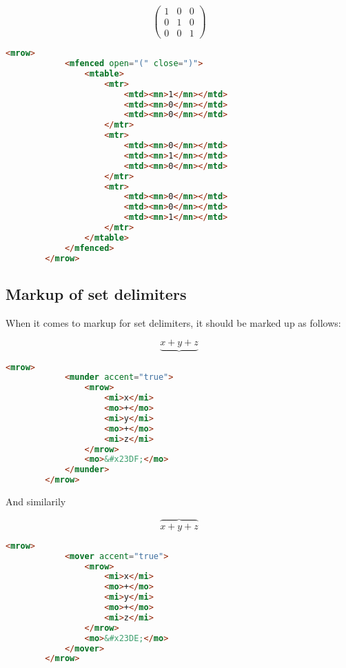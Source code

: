 \documentclass[english,a4paper,11pt]{article}
\begin{document}
\begin{eksempler}
	\begin{equation}
	\begin{pmatrix}
		1 & 0 & 0\\
		0 & 1 & 0\\
		0 & 0 & 1
	\end{pmatrix}
	\end{equation}

	\begin{lstlisting}[language=HTML]
		<mrow>
			<mfenced open="(" close=")">
				<mtable>
					<mtr>
						<mtd><mn>1</mn></mtd>
						<mtd><mn>0</mn></mtd>
						<mtd><mn>0</mn></mtd>
					</mtr>
					<mtr>
						<mtd><mn>0</mn></mtd>
						<mtd><mn>1</mn></mtd>
						<mtd><mn>0</mn></mtd>
					</mtr>
					<mtr>
						<mtd><mn>0</mn></mtd>
						<mtd><mn>0</mn></mtd>
						<mtd><mn>1</mn></mtd>
					</mtr>
				</mtable>
			</mfenced>
	  	</mrow>
	\end{lstlisting}
\end{eksempler}

\subsection{Markup of set delimiters}

When it comes to markup for set delimiters, it should be marked up as follows:

\begin{eksempler}
	\begin{equation}
		\underbrace{x+y+z}
	\end{equation}

	\begin{lstlisting}[language=HTML]
		<mrow>
			<munder accent="true">
				<mrow>
					<mi>x</mi>
					<mo>+</mo>
					<mi>y</mi>
					<mo>+</mo>
					<mi>z</mi>
				</mrow>
				<mo>&#x23DF;</mo>
			</munder>
	  	</mrow>
	\end{lstlisting}


And similarily

	\begin{equation}
		\overbrace{x+y+z}
	\end{equation}

	\begin{lstlisting}[language=HTML]
		<mrow>
			<mover accent="true">
				<mrow>
					<mi>x</mi>
					<mo>+</mo>
					<mi>y</mi>
					<mo>+</mo>
					<mi>z</mi>
				</mrow>
				<mo>&#x23DE;</mo>
			</mover>
	  	</mrow>
	\end{lstlisting}
\end{eksempler}
\end{document}
